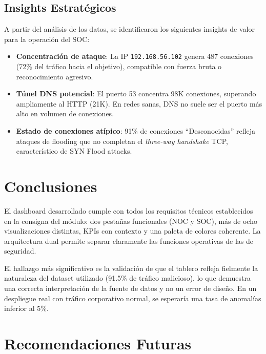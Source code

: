 \documentclass[conference]{IEEEtran}
\begin{document}
\subsection{Insights Estrat\'egicos}
A partir del an\'alisis de los datos, se identificaron los siguientes insights de valor para la operaci\'on del SOC:

\begin{itemize}
    \item \textbf{Concentraci\'on de ataque}: La IP \texttt{192.168.56.102} genera 487 conexiones (72\% del tr\'afico hacia el objetivo), compatible con fuerza bruta o reconocimiento agresivo.
    \item \textbf{T\'unel DNS potencial}: El puerto 53 concentra 98K conexiones, superando ampliamente al HTTP (21K). En redes sanas, DNS no suele ser el puerto m\'as alto en volumen de conexiones.
    \item \textbf{Estado de conexiones at\'ipico}: 91\% de conexiones ``Desconocidas'' refleja ataques de flooding que no completan el \textit{three-way handshake} TCP, caracter\'istico de SYN Flood attacks.
\end{itemize}

\section{Conclusiones}

El dashboard desarrollado cumple con todos los requisitos t\'ecnicos establecidos en la consigna del m\'odulo: dos pesta\~nas funcionales (NOC y SOC), m\'as de ocho visualizaciones distintas, KPIs con contexto y una paleta de colores coherente. La arquitectura dual permite separar claramente las funciones operativas de las de seguridad.

El hallazgo m\'as significativo es la validaci\'on de que el tablero refleja fielmente la naturaleza del dataset utilizado (91.5\% de tr\'afico malicioso), lo que demuestra una correcta interpretaci\'on de la fuente de datos y no un error de dise\~no. En un despliegue real con tr\'afico corporativo normal, se esperar\'ia una tasa de anomal\'ias inferior al 5\%.

\section{Recomendaciones Futuras}
\end{document}
